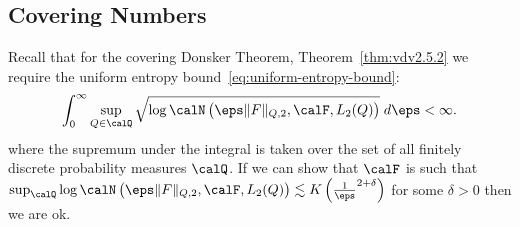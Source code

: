 
\subsection{Covering Numbers}%
\label{subsec:covering}

Recall that for the covering Donsker Theorem, Theorem~\ref{thm:vdv2.5.2} we require the uniform entropy bound~\eqref{eq:uniform-entropy-bound}:
\[
	\int_{0}^{\infty}  \sup_{Q\in\calQ} \sqrt{\log \calN\left(\eps\|F\|_{Q,2},\calF,L_2(Q)\right)}\;d\eps < \infty
.\] 
where the supremum under the integral is taken over the set of all finitely discrete probability measures \(\calQ\). If we can show that \(\calF\) is such that \(\sup_\calQ \log \calN\left(\eps\|F\|_{Q,2},\calF,L_2(Q)\right) \lesssim K\left(\frac{1}{\eps}^{2+\delta}\right)\) for some \(\delta > 0\) then we are ok.
